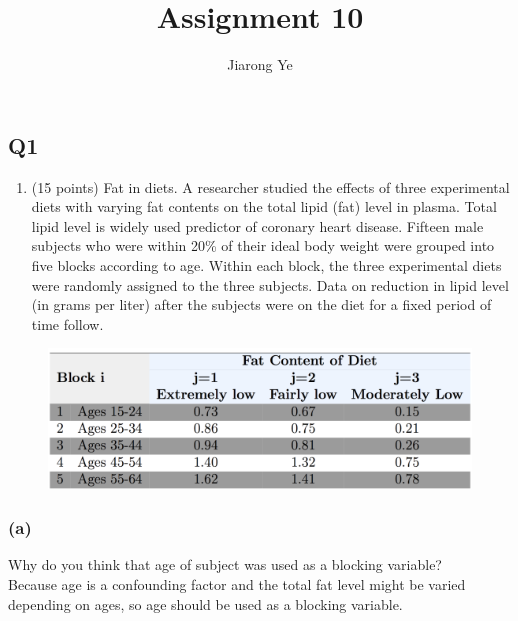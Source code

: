\documentclass[11pt]{article}
\title{Assignment 10}
\author{Jiarong Ye}
\makeatletter
\def\maxwidth{\ifdim\Gin@nat@width>\linewidth\linewidth
    \else\Gin@nat@width\fi}
\let\Oldincludegraphics\includegraphics
\renewcommand{\includegraphics}[1]{\Oldincludegraphics[width=.8\maxwidth]{#1}}
\providecommand{\tightlist}{%
      \setlength{\itemsep}{0pt}\setlength{\parskip}{0pt}}
\makeatother
\begin{document}
    
    
    \maketitle
    
    

    
    \subsection*{Q1}\label{q1}

\begin{enumerate}
\def\labelenumi{\arabic{enumi}.}
\tightlist
\item
  (15 points) Fat in diets. A researcher studied the effects of three
  experimental diets with varying fat contents on the total lipid (fat)
  level in plasma. Total lipid level is widely used predictor of
  coronary heart disease. Fifteen male subjects who were within 20\% of
  their ideal body weight were grouped into five blocks according to
  age. Within each block, the three experimental diets were randomly
  assigned to the three subjects. Data on reduction in lipid level (in
  grams per liter) after the subjects were on the diet for a fixed
  period of time follow.
\end{enumerate}

\begin{figure}[H]
\centering
\includegraphics{1.png}
\caption{}
\end{figure}

    \subsubsection*{(a)}\label{a}

Why do you think that age of subject was used as a blocking variable? \\

    Because age is a confounding factor and the total fat level might be
varied depending on ages, so age should be used as a blocking variable.
\end{document}
